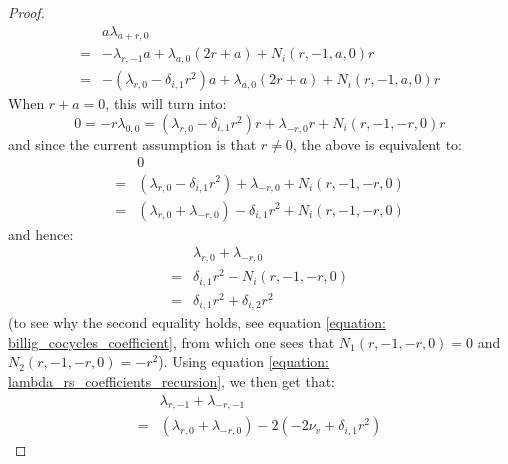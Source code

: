 \begin{proof}
$$\begin{aligned}
                            & a \lambda_{a + r, 0}
                            \\
                            = & -\lambda_{r, -1} a + \lambda_{a, 0} \left( 2r + a \right) + N_i(r, -1, a, 0) r
                            \\
                            = & -(\lambda_{r, 0} - \delta_{i, 1} r^2) a + \lambda_{a, 0} \left( 2r + a \right) + N_i(r, -1, a, 0) r
                        \end{aligned}
                    $$
                When $r + a = 0$, this will turn into:
                    $$0 = -r \lambda_{0, 0} = (\lambda_{r, 0} - \delta_{i, 1} r^2) r + \lambda_{-r, 0} r + N_i(r, -1, -r, 0) r$$
                and since the current assumption is that $r \not = 0$, the above is equivalent to:
                    $$
                        \begin{aligned}
                            & 0
                            \\
                            = & (\lambda_{r, 0} - \delta_{i, 1} r^2) + \lambda_{-r, 0} + N_i(r, -1, -r, 0)
                            \\
                            = & (\lambda_{r, 0} + \lambda_{-r, 0}) - \delta_{i, 1} r^2 + N_i(r, -1, -r, 0)
                        \end{aligned}
                    $$
                and hence:
                    $$
                        \begin{aligned}
                            & \lambda_{r, 0} + \lambda_{-r, 0}
                            \\
                            = & \delta_{i, 1} r^2 - N_i(r, -1, -r, 0)
                            \\
                            = & \delta_{i, 1} r^2 + \delta_{i, 2} r^2
                        \end{aligned}
                    $$
                (to see why the second equality holds, see equation \eqref{equation: billig_cocycles_coefficient}, from which one sees that $N_1(r, -1, -r, 0) = 0$ and $N_2(r, -1, -r, 0) = -r^2$). Using equation \eqref{equation: lambda_rs_coefficients_recursion}, we then get that:
                    $$
                        \begin{aligned}
                            & \lambda_{r, -1} + \lambda_{-r, -1}
                            \\
                            = & ( \lambda_{r, 0} + \lambda_{-r, 0} ) - 2(-2\nu_v + \delta_{i, 1} r^2)

\end{aligned}$$
\end{proof}

